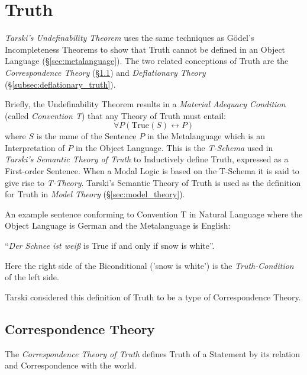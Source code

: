 \documentclass{article}
\begin{document}
\section{Truth}\label{sec:semantic_truth}

\emph{Tarski's Undefinability Theorem} \cite{tarski36} uses the same
techniques as G\"odel's Incompleteness Theorems to show that Truth
cannot be defined in an Object Language
(\S\ref{sec:metalanguage}). The two related conceptions of Truth are
the \emph{Correspondence Theory} (\S\ref{subsec:correspondence_truth})
and \emph{Deflationary Theory} (\S\ref{subsec:deflationary_truth}).

Briefly, the Undefinability Theorem results in a \emph{Material
  Adequacy Condition} (called \emph{Convention T}) that any Theory of
Truth must entail:
\[
    \forall P (\mathrm{True}(S) \leftrightarrow P)
\]
where $S$ is the name of the Sentence $P$ in the Metalanguage which is
an Interpretation of $P$ in the Object Language. This is the
\emph{T-Schema} used in \emph{Tarski's Semantic Theory of Truth} to
Inductively define Truth, expressed as a First-order Sentence. When a
Modal Logic is based on the T-Schema it is said to give rise to
\emph{T-Theory}. Tarski's Semantic Theory of Truth is used as the
definition for Truth in \emph{Model Theory}
(\S\ref{sec:model_theory}).

An example sentence conforming to Convention T in Natural Language
where the Object Language is German and the Metalanguage is English:
\begin{description}
\item ``\emph{Der Schnee ist wei\ss} is True if and only if snow is
  white''.
\end{description}
Here the right side of the Biconditional ('snow is white') is the
\emph{Truth-Condition} of the left side.

Tarski considered this definition of Truth to be a type of
Correspondence Theory.

\subsection{Correspondence Theory}\label{subsec:correspondence_truth}

The \emph{Correspondence Theory of Truth} defines Truth of a Statement
by its relation and Correspondence with the world.
\end{document}
